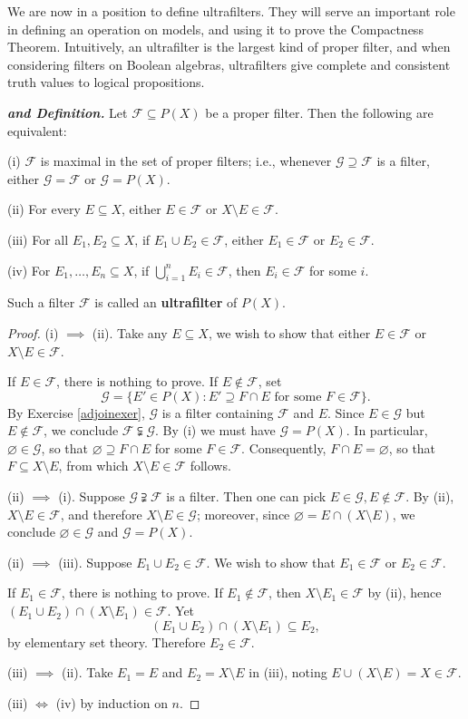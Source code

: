 \documentclass{article}
\def\F{\mathscr F}
\def\G{\mathscr G}
\begin{document}
\noindent We are now in a position to define ultrafilters.  They will serve an important role in defining an operation on models, and using it to prove the Compactness Theorem.  Intuitively, an ultrafilter is the largest kind of proper filter, and when considering filters on Boolean algebras, ultrafilters give complete and consistent truth values to logical propositions.
\begin{proposition}\label{ultrafilterdef}\textbf{\emph{and Definition.}}
Let $\F\subseteq P(X)$ be a proper filter.  Then the following are equivalent:

(i) $\F$ is maximal in the set of proper filters; i.e., whenever $\G\supseteq\F$ is a filter, either $\G=\F$ or $\G=P(X)$.

(ii) For every $E\subseteq X$, either $E\in\F$ or $X\setminus E\in\F$.

(iii) For all $E_1,E_2\subseteq X$, if $E_1\cup E_2\in\F$, either $E_1\in\F$ or $E_2\in\F$.

(iv) For $E_1,\dots,E_n\subseteq X$, if $\bigcup_{i=1}^nE_i\in\F$, then $E_i\in\F$ for some $i$.

Such a filter $\F$ is called an \textbf{ultrafilter} of $P(X)$.
\end{proposition}
\begin{proof}
(i) $\implies$ (ii). Take any $E\subseteq X$, we wish to show that either $E\in\F$ or $X\setminus E\in\F$.

If $E\in\F$, there is nothing to prove.  If $E\notin\F$, set
$$\G=\{E'\in P(X):E'\supseteq F\cap E\text{ for some }F\in\F\}.$$
By Exercise \ref{adjoinexer}, $\G$ is a filter containing $\F$ and $E$.  Since $E\in\G$ but $E\notin\F$, we conclude $\F\subsetneqq\G$.  By (i) we must have $\G=P(X)$.  In particular, $\varnothing\in\G$, so that $\varnothing\supseteq F\cap E$ for some $F\in\F$.  Consequently, $F\cap E=\varnothing$, so that $F\subseteq X\setminus E$, from which $X\setminus E\in\F$ follows.

(ii) $\implies$ (i). Suppose $\G\supsetneqq\F$ is a filter.  Then one can pick $E\in\G,E\notin\F$.  By (ii), $X\setminus E\in\F$, and therefore $X\setminus E\in\G$; moreover, since $\varnothing=E\cap(X\setminus E)$, we conclude $\varnothing\in\G$ and $\G=P(X)$.

(ii) $\implies$ (iii). Suppose $E_1\cup E_2\in\F$.  We wish to show that $E_1\in\F$ or $E_2\in\F$.

If $E_1\in\F$, there is nothing to prove.  If $E_1\notin\F$, then $X\setminus E_1\in\F$ by (ii), hence $(E_1\cup E_2)\cap(X\setminus E_1)\in\F$.  Yet
$$(E_1\cup E_2)\cap(X\setminus E_1)\subseteq E_2,$$
by elementary set theory.  Therefore $E_2\in\F$.

(iii) $\implies$ (ii). Take $E_1=E$ and $E_2=X\setminus E$ in (iii), noting $E\cup(X\setminus E)=X\in\F$.

(iii) $\iff$ (iv) by induction on $n$.
\end{proof}
\end{document}
